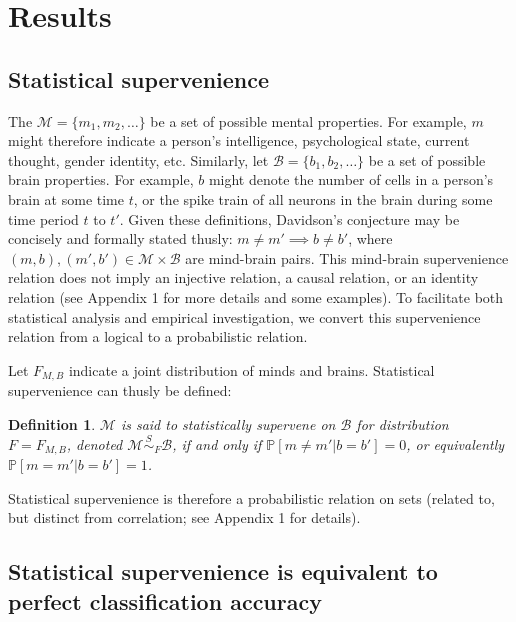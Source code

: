 \documentclass{article}
\newcommand{\mB}{\mathcal{B}}
\newcommand{\mM}{\mathcal{M}}
\newcommand{\PP}{\mathbb{P}}           %
\providecommand{\mc}[1]{\mathcal{#1}}
\newtheorem{defi}{Definition}
\begin{document}
\section*{Results}

\subsection*{Statistical supervenience} %

\noindent The $\mc{M}=\{m_1, m_2, \ldots\}$ be a set of possible mental properties. For example, $m$ might therefore indicate a person's intelligence, psychological state, current thought, gender identity, etc.   Similarly, let $\mc{B}=\{b_1,b_2,\ldots\}$ be a set of possible brain properties.  For example, $b$ might denote the number of cells in a person's brain at some time $t$, or the spike train of all neurons in the brain during some time period $t$ to $t'$. Given these definitions, Davidson's conjecture may be concisely and formally stated thusly:  $m \neq m' \implies b \neq b'$, where $(m,b), (m',b') \in \mc{M} \times \mc{B}$ are mind-brain pairs.  This mind-brain supervenience relation does not imply an injective relation, a causal relation, or an identity relation (see Appendix 1 for more details and some examples).  To facilitate both statistical analysis and empirical investigation, we convert this supervenience relation from a logical to a probabilistic relation.  

Let $F_{M,B}$ indicate a joint distribution of minds and brains. Statistical supervenience can thusly be defined:
\begin{defi}
\label{def1} 
$\mM$ is said to \textit{statistically supervene} on $\mB$ for distribution $F=F_{M,B}$, denoted $\mM \overset{S}{\sim}_F \mB$, if and only if $\PP[m \neq m' | b=b']=0$, or equivalently $\PP[m = m' | b = b']=1$. 
\end{defi}
\noindent Statistical supervenience is therefore a probabilistic relation on sets (related to, but distinct from correlation; see Appendix 1 for details).  



\subsection*{Statistical supervenience is equivalent to perfect classification accuracy} %
\label{sub:theoretical_results}
\end{document}
